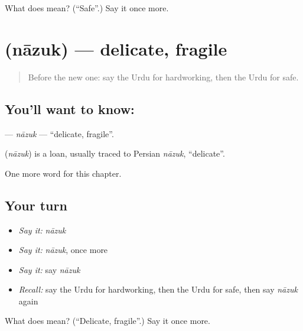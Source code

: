 \begin{tcolorbox}[breakable,colback=teal!4,colframe=teal!35!black,title={Before you move on}]
What does  mean? (\textquotedblleft{}Safe\textquotedblright{}.) Say it once more.
\end{tcolorbox}
\section[\texorpdfstring{\ur{نازک} (nāzuk)}{نازک (nāzuk)}]{ (nāzuk) — delicate, fragile}

\label{lesson:UR-C161-nazuk}



\begin{quote}
Before the new one: say the Urdu for hardworking, then the Urdu for safe.
\end{quote}

\subsection*{You'll want to know: }
\textbf{} — \emph{nāzuk} — \textquotedblleft{}delicate, fragile\textquotedblright{}.

\begin{cousinweb}
\textbf{} (\emph{nāzuk}) is a loan, usually traced to Persian \emph{nāzuk}, \textquotedblleft{}delicate\textquotedblright{}.
\end{cousinweb}

\begin{grammarlens}[title={What you've built}]
One more word for this chapter.
\end{grammarlens}

\subsection*{Your turn}
\begin{itemize}
\raggedright
  \item \emph{Say it:} \emph{nāzuk}
  \item \emph{Say it:} \emph{nāzuk}, once more
  \item \emph{Say it:} say \emph{nāzuk}
  \item \emph{Recall:} say the Urdu for hardworking, then the Urdu for safe, then say \emph{nāzuk} again
\end{itemize}

\begin{tcolorbox}[breakable,colback=teal!4,colframe=teal!35!black,title={Before you move on}]
What does  mean? (\textquotedblleft{}Delicate, fragile\textquotedblright{}.) Say it once more.
\end{tcolorbox}
